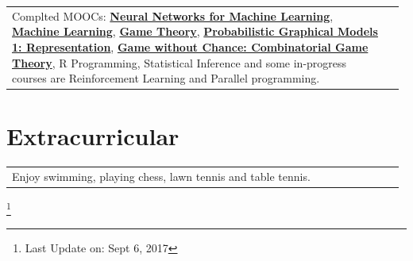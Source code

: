 \documentclass[a4paper]{article} %
\newcommand{\verticalspacing}{-0.25cm}
\newcommand{\projectheadspacing}{6.9cm}
\newcommand{\lineskill}[2]{%
    \begin{tabular}{p{0.98\linewidth}r}
        \small {#2} & \multicolumn{1}{m{ \projectheadspacing{} }}{\raggedleft \textsc{\small #1}}\\
    \end{tabular}
    \vspace{\verticalspacing{}}
    \vspace{-0.0cm} %
}
\begin{document}
\lineskill
	{}
	{Complted MOOCs: \href{https://www.coursera.org/account/accomplishments/records/3XH3Q2E43JFS}{\textbf{Neural Networks for Machine Learning}}, \href{https://www.coursera.org/account/accomplishments/records/7A66NHG2A623}{\textbf{Machine Learning}}, \href{https://www.coursera.org/account/accomplishments/records/W6T3VHGE9ARX}{\textbf{Game Theory}}, \href{https://www.coursera.org/account/accomplishments/records/JRHRADFQSTAF}{\textbf{Probabilistic Graphical Models 1: Representation}}, \href{https://www.dropbox.com/s/uda09uulzed6zc7/Game\%20without\%20chance\%20certificate.pdf}{\textbf{Game without Chance: Combinatorial Game Theory}}, R Programming, Statistical Inference and some in-progress courses are Reinforcement Learning and Parallel programming.}




\section{Extracurricular}

\lineskill
    {}
    {Enjoy swimming, playing chess, lawn tennis and table tennis.}

\vspace{-0.65cm}
\let\thefootnote\relax\footnote{Last Update on: Sept 6, 2017}
\end{document}
